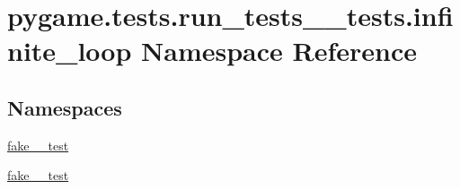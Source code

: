\hypertarget{namespacepygame_1_1tests_1_1run__tests____tests_1_1infinite__loop}{}\section{pygame.\+tests.\+run\+\_\+tests\+\_\+\+\_\+tests.\+infinite\+\_\+loop Namespace Reference}
\label{namespacepygame_1_1tests_1_1run__tests____tests_1_1infinite__loop}
\subsection*{Namespaces}
\begin{DoxyCompactItemize}
\item 
 \hyperlink{namespacepygame_1_1tests_1_1run__tests____tests_1_1infinite__loop_1_1fake__1__test}{fake\+\_\+\_\+test}
\item 
 \hyperlink{namespacepygame_1_1tests_1_1run__tests____tests_1_1infinite__loop_1_1fake__2__test}{fake\+\_\+\_\+test}
\end{DoxyCompactItemize}
